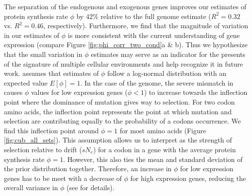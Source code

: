 The separation of the endogenous and exogenous genes improves our estimates of protein synthesis rate $\phi$ by $42 \%$ relative to the full genome estimate ($R^2 = 0.32$ vs. $R^2 = 0.46$, respectively).
Furthermore, we find that the magnitude of variation in our estimates of $\phi$ is more consistent with the current understanding of gene expression (compare Figure \ref{fig:phi_corr_two_cond}a \& b).
Thus we hypothesize that the small variation in $\phi$ estimates may serve as an indicator for the presents of the signature of multiple cellular environments and help recognize it in future work.
\ROC assumes that estimates of $\phi$ follow a log-normal distribution with an expected value $E[\phi] = 1$. 
In the case of the \kluyveri genome, the severe mismatch in \DM causes $\phi$ values for low expression genes ($\phi < 1$) to increase towards the inflection point where the dominance of mutation gives way to selection.
For two codon amino acids, the inflection point represents the point at which mutation and selection are contributing equally to the probability of a codons occurrence.
We find this inflection point around $\phi = 1$ for most amino acids (Figure \ref{fig:cub_all_sets}). 
This assumption allows us to interpret \DE as the strength of selection relative to drift ($sN_e$) for a codon in a gene with the average protein synthesis rate $\phi = 1$.
However, this also ties the mean and standard deviation of the prior distribution together.
Therefore, an increase in $\phi$ for low expression genes has to be meet with a decrease of $\phi$ for high expression genes, reducing the overall variance in $\phi$ (see \citep{gilchrist2015} for details). 


